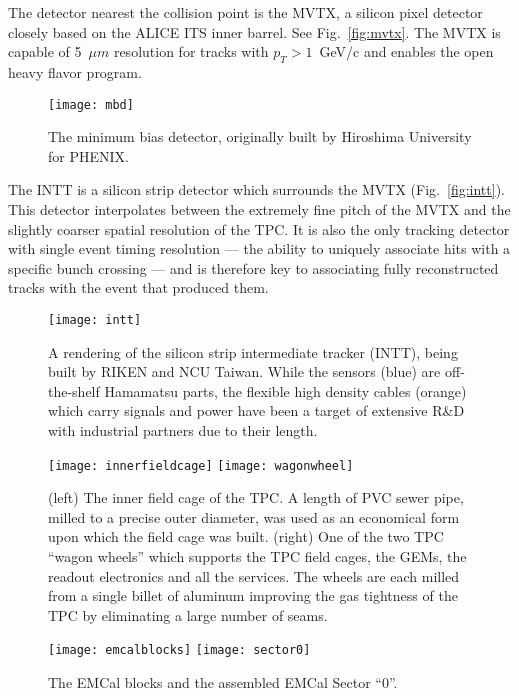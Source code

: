 The detector nearest the collision point is the MVTX, a silicon pixel
detector closely based on the ALICE ITS inner barrel.  See
Fig.~\ref{fig:mvtx}.  The MVTX is capable of 5~$\mu m$ resolution for
tracks with $p_T > 1$~GeV/c and enables the open heavy flavor program.

\begin{figure}[hbt!]
  \centering
  \texttt{[image: mbd]}
  \caption{The minimum bias detector, originally built by Hiroshima
    University for PHENIX.}
  \label{fig:mbd}
\end{figure}

The INTT is a silicon strip detector which surrounds the MVTX
(Fig.~\ref{fig:intt}).  This detector interpolates between the
extremely fine pitch of the MVTX and the slightly coarser spatial
resolution of the TPC.  It is also the only tracking detector with
single event timing resolution --- the ability to uniquely associate
hits with a specific bunch crossing --- and is therefore key to
associating fully reconstructed tracks with the event that produced
them.

\begin{figure}[hbt!]
  \centering
  \texttt{[image: intt]}
  \caption{A rendering of the silicon strip intermediate tracker
    (INTT), being built by RIKEN and NCU Taiwan.  While the sensors
    (blue) are off-the-shelf Hamamatsu parts, the flexible high
    density cables (orange) which carry signals and power have been a
    target of extensive R\&D with industrial partners due to their
    length.}
  \label{fig:mbd}
\end{figure}


\begin{figure}[hbt!]
  \centering
  \texttt{[image: innerfieldcage]}
  \hfill
  \texttt{[image: wagonwheel]}
  \caption{(left) The inner field cage of the TPC. A length of PVC
    sewer pipe, milled to a precise outer diameter, was used as an
    economical form upon which the field cage was built.  (right) One
    of the two TPC ``wagon wheels'' which supports the TPC field
    cages, the GEMs, the readout electronics and all the services.
    The wheels are each milled from a single billet of aluminum
    improving the gas tightness of the TPC by eliminating a large
    number of seams.}
  \label{fig:wagonwheel}
\end{figure}

\begin{figure}[hbt!]
  \centering
  \texttt{[image: emcalblocks]}
  \hfill
  \texttt{[image: sector0]}
  \caption{The EMCal blocks and the assembled EMCal Sector ``0''.}
  \label{fig:emcal}
\end{figure}

